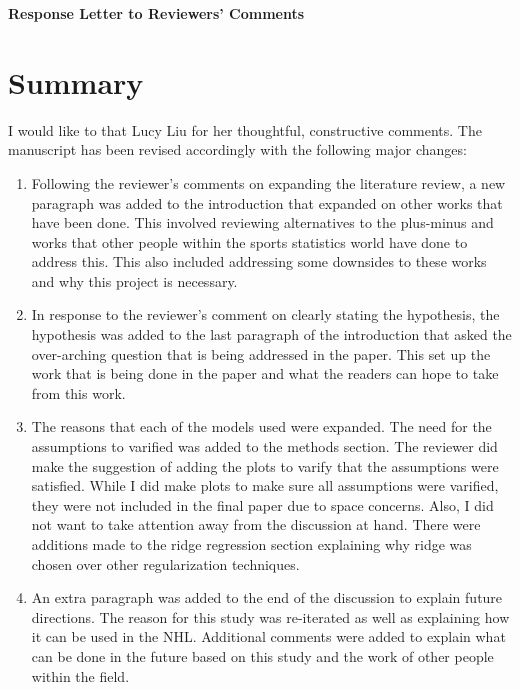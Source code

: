 \documentclass[12pt]{article}
\begin{document}
\begin{center}
  {\Large\bf Response Letter to Reviewers' Comments}
\end{center}


\section{Summary}

I would like to that Lucy Liu for her thoughtful, constructive
comments. The manuscript has been revised accordingly with the
following major changes:

\begin{enumerate}
\item
  Following the reviewer's comments on expanding the literature
  review, a new paragraph was added to the introduction that
  expanded on other works that have been done. This involved reviewing
  alternatives to the plus-minus and works that other people
  within the sports statistics world have done to address this.
  This also included addressing some downsides to these works and
  why this project is necessary.
  
\item
  In response to the reviewer's comment on clearly stating the 
  hypothesis, the hypothesis was added to the last paragraph of the 
  introduction that asked the over-arching question that is being
  addressed in the paper. This set up the work that is being done
  in the paper and what the readers can hope to take from this work.

\item
  The reasons that each of the models used were expanded. The need
  for the assumptions to varified was added to the methods section.
  The reviewer did make the suggestion of adding the plots to varify 
  that the assumptions were satisfied. While I did make plots to make
  sure all assumptions were varified, they were not included in the final
  paper due to space concerns. Also, I did not want to take attention
  away from the discussion at hand. There were additions made to the 
  ridge regression section explaining why ridge was chosen over other 
  regularization techniques.

\item 
  An extra paragraph was added to the end of the discussion to explain
  future directions. The reason for this study was re-iterated as well as
  explaining how it can be used in the NHL. Additional comments were added
  to explain what can be done in the future based on this study and the
  work of other people within the field.

\end{enumerate}
\end{document}
